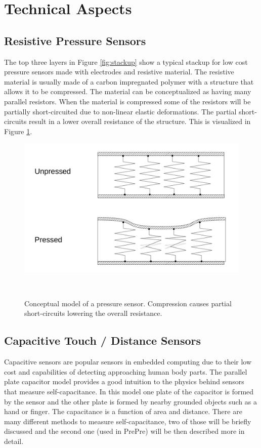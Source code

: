 \documentclass{sigchi-ext}
\begin{document}
\section{Technical Aspects}
\subsection{Resistive Pressure Sensors}
The top three layers in Figure \ref{fig:stackup} show a typical stackup for 
low cost pressure sensors made with electrodes and resistive material. The
resistive material is usually made of a carbon impregnated polymer
with a structure that allows it to be compressed. The material
can be conceptualized as having many parallel resistors. When the material is
compressed some of the resistors will be partially short-circuited due to
non-linear elastic deformations. The partial short-circuits result in a lower
overall resistance of the structure. This is visualized
in Figure \ref{fig:pressure_sensor}.

\begin{figure}[h!]
\centering
\includegraphics[trim={0 1.4cm 0 1.7cm},clip,width=0.9\columnwidth]{figures/resistive_sensor}
 \caption{Conceptual model of a pressure sensor. Compression causes
  partial short-circuits lowering the overall resistance.}~\label{fig:pressure_sensor}
\end{figure}


\subsection{Capacitive Touch / Distance Sensors}
Capacitive sensors are popular sensors in embedded computing due to their low cost and capabilities of detecting approaching human body parts. The parallel plate capacitor model provides a good intuition to the physics behind sensors that measure self-capacitance. In this model one plate of the capacitor is formed by the sensor and the other plate is formed by nearby grounded objects such as a hand or finger. The capacitance is a function of area and distance. There are many different methods to measure self-capacitance, two of those will be briefly discussed and the second one (used in PrePre) will be then described more in detail. 
\end{document}
